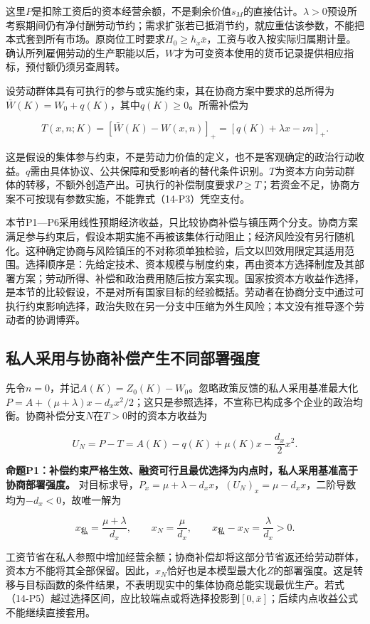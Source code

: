 \documentclass[UTF8,fontset=windows,12pt,a4paper,oneside,openany]{ctexbook}
\begin{document}
这里$P$是扣除工资后的资本经营余额，不是剩余价值$s_M$的直接估计。$\lambda>0$预设所考察期间仍有净付酬劳动节约；需求扩张若已抵消节约，就应重估该参数，不能把本式套到所有市场。原岗位工时要求$H_0\geq h_x\bar x$，工资与收入按实际归属期计量。确认所列雇佣劳动的生产职能以后，$W$才为可变资本使用的货币记录提供相应指标，预付额仍须另查周转。

设劳动群体具有可执行的参与或实施约束，其在协商方案中要求的总所得为$\bar W(K)=W_0+q(K)$，其中$q(K)\geq0$。所需补偿为

\[
T(x,n;K)=[\bar W(K)-W(x,n)]_+
       =[q(K)+\lambda x-\nu n]_+.
\tag{14-P3}
\]

这是假设的集体参与约束，不是劳动力价值的定义，也不是客观确定的政治行动收益。$q$需由具体协议、公共保障和受影响者的替代条件识别。$T$为资本方向劳动群体的转移，不额外创造产出。可执行的补偿制度要求$P\geq T$；若资金不足，协商方案不可按现有参数实施，不能靠式（14-P3）凭空支付。

本节P1—P6采用线性预期经济收益，只比较协商补偿与镇压两个分支。协商方案满足参与约束后，假设本期实施不再被该集体行动阻止；经济风险没有另行随机化。这种确定协商与风险镇压的不对称须单独检验，后文以凹效用限定其适用范围。选择顺序是：先给定技术、资本规模与制度约束，再由资本方选择制度及其部署方案；劳动所得、补偿和政治费用随后按方案实现。国家按资本方收益作选择，是本节的比较假设，不是对所有国家目标的经验概括。劳动者在协商分支中通过可执行约束影响选择，政治失败在另一分支中压缩为外生风险；本文没有推导逐个劳动者的协调博弈。

\subsection{私人采用与协商补偿产生不同部署强度}

先令$n=0$，并记$A(K)=Z_0(K)-W_0$。忽略政策反馈的私人采用基准最大化$P=A+(\mu+\lambda)x-d_xx^2/2$；这只是参照选择，不宣称已构成多个企业的政治均衡。协商补偿分支$N$在$T>0$时的资本方收益为

\[
U_N=P-T=A(K)-q(K)+\mu(K)x-\frac{d_x}{2}x^2.
\tag{14-P4}
\]

\textbf{命题P1：补偿约束严格生效、融资可行且最优选择为内点时，私人采用基准高于协商部署强度。} 对目标求导，$P_x=\mu+\lambda-d_xx$，$(U_N)_x=\mu-d_xx$，二阶导数均为$-d_x<0$，故唯一解为

\[
x_{\mathrm{私}}=\frac{\mu+\lambda}{d_x},\qquad
x_N=\frac{\mu}{d_x},\qquad
x_{\mathrm{私}}-x_N=\frac{\lambda}{d_x}>0.
\tag{14-P5}
\]

工资节省在私人参照中增加经营余额；协商补偿却将这部分节省返还给劳动群体，资本方不能将其全部保留。因此，$x_N$恰好也是本模型最大化$Z$的部署强度。这是转移与目标函数的条件结果，不表明现实中的集体协商总能实现最优生产。若式（14-P5）越过选择区间，应比较端点或将选择投影到$[0,\bar x]$；后续内点收益公式不能继续直接套用。
\end{document}
